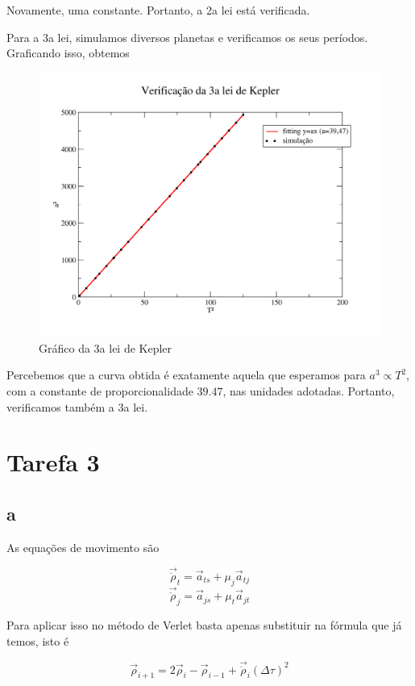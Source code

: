 \documentclass[12pt,a4paper]{article}
\begin{document}
Novamente, uma constante. Portanto, a 2a lei está verificada.

Para a 3a lei, simulamos diversos planetas e verificamos os seus períodos. Graficando isso, obtemos

\begin{figure}[H]
\centering
\includegraphics[width=\linewidth]{../tarefa-2a/grafico_3alei.png}
\caption{Gráfico da 3a lei de Kepler}
\end{figure}

Percebemos que a curva obtida é exatamente aquela que esperamos para $a^3 \propto T^2$, com a constante de proporcionalidade $39.47$, nas unidades adotadas. Portanto, verificamos também a 3a lei.

\section{Tarefa 3}
\subsection{a}

As equações de movimento são

\[ \vec{\ddot{\rho}}_t = \vec{a}_{ts} + \mu_j\vec{a}_{tj} \]
\[ \vec{\ddot{\rho}}_j = \vec{a}_{js} + \mu_t\vec{a}_{jt} \]

Para aplicar isso no método de Verlet basta apenas substituir na fórmula que já temos, isto é

\[ \vec{\rho}_{i+1} = 2\vec{\rho}_i - \vec{\rho}_{i-1} + \vec{\ddot{\rho}}_i(\Delta \tau)^2 \]
\end{document}
